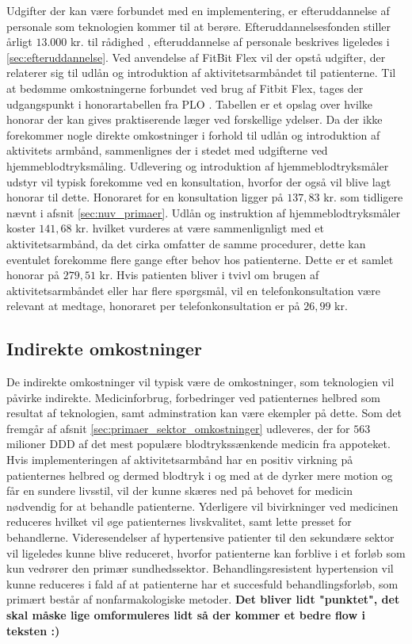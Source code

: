 Udgifter der kan være forbundet med en implementering, er efteruddannelse af personale som teknologien kommer til at berøre. Efteruddannelsesfonden stiller årligt $13.000$ kr. til rådighed \citep{vedsted2005}, efteruddannelse af personale beskrives ligeledes i \autoref{sec:efteruddannelse}.   
Ved anvendelse af FitBit Flex vil der opstå udgifter, der relaterer sig til udlån og introduktion af aktivitetsarmbåndet til patienterne. Til at bedømme omkostningerne forbundet ved brug af Fitbit Flex, tages der udgangspunkt i honorartabellen fra PLO \citep{honorartabel2016}. Tabellen er et opslag over hvilke honorar der kan gives praktiserende læger ved forskellige ydelser.
Da der ikke forekommer nogle direkte omkostninger i forhold til udlån og introduktion af aktivitets armbånd, sammenlignes der i stedet med udgifterne ved hjemmeblodtryksmåling. Udlevering og introduktion af hjemmeblodtryksmåler udstyr vil typisk forekomme ved en konsultation, hvorfor der også vil blive lagt honorar til dette. Honoraret for en konsultation ligger på $137,83$ kr. som tidligere nævnt i afsnit \autoref{sec:nuv_primaer}. Udlån og instruktion af hjemmeblodtryksmåler koster $141,68$ kr. hvilket vurderes at være sammenlignligt med et aktivitetsarmbånd, da det cirka omfatter de samme procedurer, dette kan eventulet forekomme flere gange efter behov hos patienterne. Dette er et samlet honorar på $279,51$ kr. Hvis patienten bliver i tvivl om brugen af aktivitetsarmbåndet eller har flere spørgsmål, vil en telefonkonsultation være relevant at medtage, honoraret per telefonkonsultation er på $26,99$ kr.

\subsection{Indirekte omkostninger}
De indirekte omkostninger vil typisk være de omkostninger, som teknologien vil påvirke indirekte. Medicinforbrug, forbedringer ved patienternes helbred som resultat af teknologien, samt adminstration kan være ekempler på dette. 
Som det fremgår af afsnit \autoref{sec:primaer_sektor_omkostninger} udleveres, der for $563$ milioner DDD af det mest populære blodtrykssænkende medicin fra appoteket. Hvis implementeringen af aktivitetsarmbånd har en positiv virkning på patienternes helbred og dermed blodtryk i og med at de dyrker mere motion og får en sundere livsstil, vil der kunne skæres ned på behovet for medicin nødvendig for at behandle patienterne. Yderligere vil bivirkninger ved medicinen reduceres hvilket vil øge patienternes livskvalitet, samt lette presset for behandlerne. 
Videresendelser af hypertensive patienter til den sekundære sektor vil ligeledes kunne blive reduceret, hvorfor patienterne kan forblive i et forløb som kun vedrører den primær sundhedssektor. Behandlingsresistent hypertension vil kunne reduceres i fald af at patienterne har et succesfuld behandlingsforløb, som primært består af nonfarmakologiske metoder.  \textbf{Det bliver lidt "punktet", det skal måske lige omformuleres lidt så der kommer et bedre flow i teksten :) }













